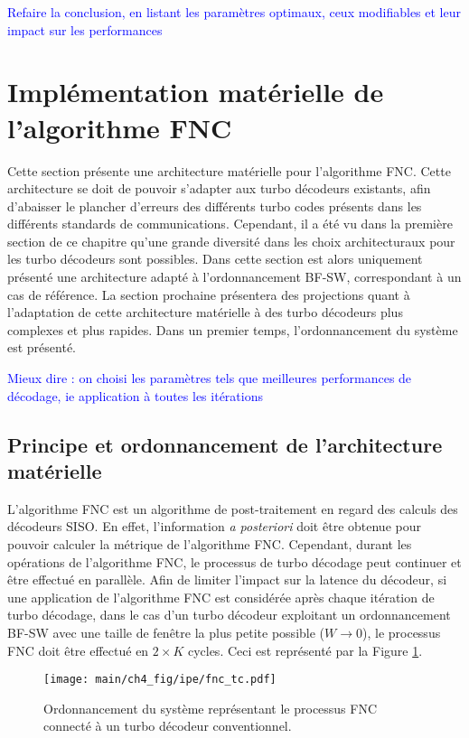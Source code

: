 \textcolor{blue}{Refaire la conclusion, en listant les paramètres optimaux, ceux modifiables et leur impact sur les 
performances}


\section{Implémentation matérielle de l'algorithme FNC}
Cette section présente une architecture matérielle pour l'algorithme FNC. Cette architecture se doit de pouvoir 
s'adapter aux turbo décodeurs existants, afin d’abaisser le plancher d'erreurs des différents turbo codes présents dans 
les différents standards de communications. Cependant, il a été vu dans la première section de ce chapitre qu'une 
grande diversité dans les choix architecturaux pour les turbo décodeurs sont possibles. Dans cette section est alors 
uniquement présenté une architecture adapté à l'ordonnancement BF-SW, correspondant à un cas de référence. La section 
prochaine présentera des projections quant à l'adaptation de cette architecture matérielle à des turbo décodeurs plus 
complexes et plus rapides. Dans un premier temps, l'ordonnancement du système est présenté.

\textcolor{blue}{Mieux dire : on choisi les paramètres tels que meilleures performances de décodage, ie application à 
toutes les itérations}

\subsection{Principe et ordonnancement de l'architecture matérielle}
L'algorithme FNC est un algorithme de post-traitement en regard des calculs des décodeurs SISO. En effet, l'information 
\textit{a posteriori} doit être obtenue pour pouvoir calculer la métrique de l'algorithme FNC. Cependant, durant les 
opérations de l'algorithme FNC, le processus de turbo décodage peut continuer et être effectué en parallèle. Afin de 
limiter l'impact sur la latence du décodeur, si une application de l'algorithme FNC est considérée après chaque 
itération de turbo décodage, dans le cas d'un turbo décodeur exploitant un ordonnancement BF-SW avec une taille de 
fenêtre la plus petite possible ($W\rightarrow 0$), le processus FNC doit être effectué en $2\times K$ cycles. Ceci est 
représenté par la Figure \ref{fig:fnc_tc}.

\begin{figure}[!h]
	\centering
	\texttt{[image: main/ch4\_fig/ipe/fnc\_tc.pdf]}
	\caption{Ordonnancement du système représentant le processus FNC connecté à un turbo décodeur conventionnel. \label{fig:fnc_tc}}
\end{figure}

